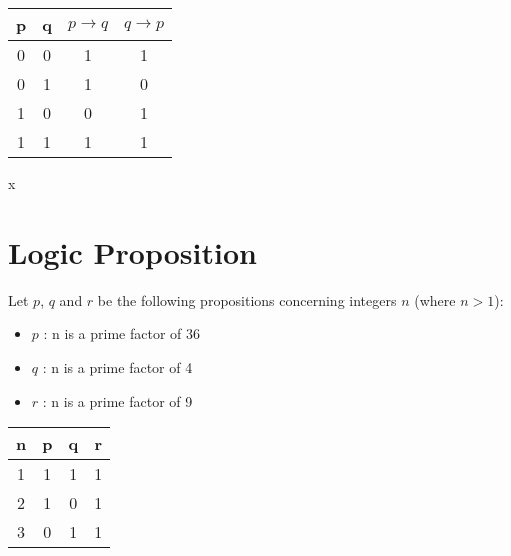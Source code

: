 \documentclass[12pt]{article}
\begin{document}
\begin{center}
\begin{tabular}{|c|c|c|c|}
\hline
p & q & $p \rightarrow q$ & $q \rightarrow p$ \\
\hline
0 & 0 & 1& 1 \\
0 & 1 & 1 & 0 \\
1 & 0 & 0 & 1 \\
1 & 1 & 1 & 1 \\
\hline
\end{tabular}
\end{center}


\newpage

x


\section{Logic Proposition}

Let $p$, $q$ and $r$ be the following propositions concerning integers $n$ (where $n>1$):

\begin{itemize}
\item $p$ : n is a prime factor of 36 %
\item $q$ : n is a prime factor of 4 %
\item $r$ : n is a prime factor of 9 %
\end{itemize}


\begin{center}
\begin{tabular}{|c||c|c|c|}
\hline 
\phantom{spa} \textbf{n} \phantom{spa}	& \phantom{spa}	\textbf{p} \phantom{spa}	& \phantom{spa}	\textbf{q} \phantom{spa}	& \phantom{spa}	\textbf{r} \phantom{spa}	\\ \hline \hline
1	&	1	&	1	&	1	\\ \hline
2	&	1	&	0	&	1	\\ \hline
3	&	0	&	1	&	1	\\ \hline
\hline 
\end{tabular} 
\end{center}
\end{document}
